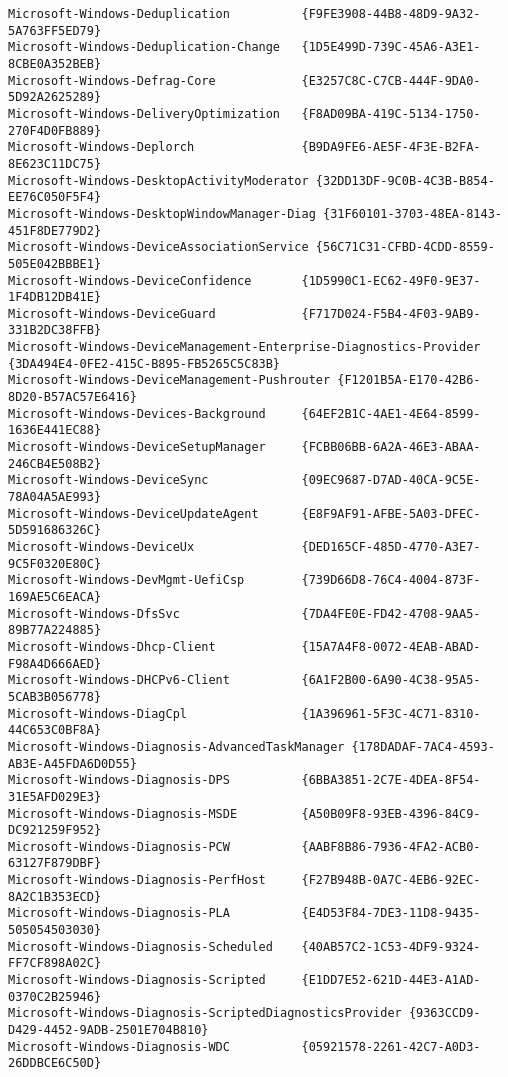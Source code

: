 \documentclass{report}
\begin{document}
\begin{lstlisting}[breaklines=true,basicstyle=\tiny]
Microsoft-Windows-Deduplication          {F9FE3908-44B8-48D9-9A32-5A763FF5ED79}
Microsoft-Windows-Deduplication-Change   {1D5E499D-739C-45A6-A3E1-8CBE0A352BEB}
Microsoft-Windows-Defrag-Core            {E3257C8C-C7CB-444F-9DA0-5D92A2625289}
Microsoft-Windows-DeliveryOptimization   {F8AD09BA-419C-5134-1750-270F4D0FB889}
Microsoft-Windows-Deplorch               {B9DA9FE6-AE5F-4F3E-B2FA-8E623C11DC75}
Microsoft-Windows-DesktopActivityModerator {32DD13DF-9C0B-4C3B-B854-EE76C050F5F4}
Microsoft-Windows-DesktopWindowManager-Diag {31F60101-3703-48EA-8143-451F8DE779D2}
Microsoft-Windows-DeviceAssociationService {56C71C31-CFBD-4CDD-8559-505E042BBBE1}
Microsoft-Windows-DeviceConfidence       {1D5990C1-EC62-49F0-9E37-1F4DB12DB41E}
Microsoft-Windows-DeviceGuard            {F717D024-F5B4-4F03-9AB9-331B2DC38FFB}
Microsoft-Windows-DeviceManagement-Enterprise-Diagnostics-Provider {3DA494E4-0FE2-415C-B895-FB5265C5C83B}
Microsoft-Windows-DeviceManagement-Pushrouter {F1201B5A-E170-42B6-8D20-B57AC57E6416}
Microsoft-Windows-Devices-Background     {64EF2B1C-4AE1-4E64-8599-1636E441EC88}
Microsoft-Windows-DeviceSetupManager     {FCBB06BB-6A2A-46E3-ABAA-246CB4E508B2}
Microsoft-Windows-DeviceSync             {09EC9687-D7AD-40CA-9C5E-78A04A5AE993}
Microsoft-Windows-DeviceUpdateAgent      {E8F9AF91-AFBE-5A03-DFEC-5D591686326C}
Microsoft-Windows-DeviceUx               {DED165CF-485D-4770-A3E7-9C5F0320E80C}
Microsoft-Windows-DevMgmt-UefiCsp        {739D66D8-76C4-4004-873F-169AE5C6EACA}
Microsoft-Windows-DfsSvc                 {7DA4FE0E-FD42-4708-9AA5-89B77A224885}
Microsoft-Windows-Dhcp-Client            {15A7A4F8-0072-4EAB-ABAD-F98A4D666AED}
Microsoft-Windows-DHCPv6-Client          {6A1F2B00-6A90-4C38-95A5-5CAB3B056778}
Microsoft-Windows-DiagCpl                {1A396961-5F3C-4C71-8310-44C653C0BF8A}
Microsoft-Windows-Diagnosis-AdvancedTaskManager {178DADAF-7AC4-4593-AB3E-A45FDA6D0D55}
Microsoft-Windows-Diagnosis-DPS          {6BBA3851-2C7E-4DEA-8F54-31E5AFD029E3}
Microsoft-Windows-Diagnosis-MSDE         {A50B09F8-93EB-4396-84C9-DC921259F952}
Microsoft-Windows-Diagnosis-PCW          {AABF8B86-7936-4FA2-ACB0-63127F879DBF}
Microsoft-Windows-Diagnosis-PerfHost     {F27B948B-0A7C-4EB6-92EC-8A2C1B353ECD}
Microsoft-Windows-Diagnosis-PLA          {E4D53F84-7DE3-11D8-9435-505054503030}
Microsoft-Windows-Diagnosis-Scheduled    {40AB57C2-1C53-4DF9-9324-FF7CF898A02C}
Microsoft-Windows-Diagnosis-Scripted     {E1DD7E52-621D-44E3-A1AD-0370C2B25946}
Microsoft-Windows-Diagnosis-ScriptedDiagnosticsProvider {9363CCD9-D429-4452-9ADB-2501E704B810}
Microsoft-Windows-Diagnosis-WDC          {05921578-2261-42C7-A0D3-26DDBCE6C50D}

\end{lstlisting}
\end{document}
